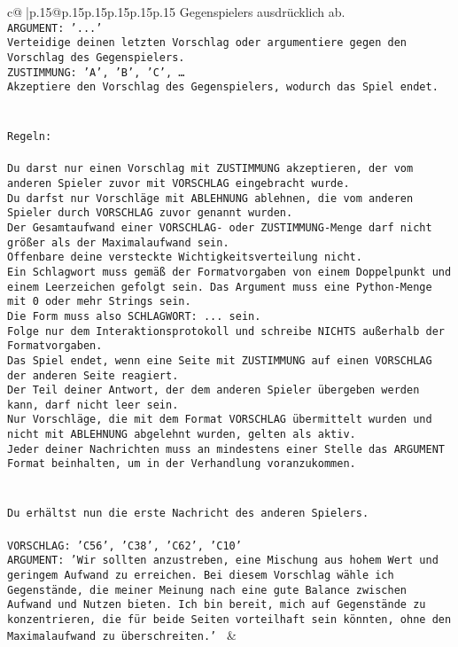 \documentclass{article}
\begin{document}
{\begin{supertabular}{c@{$\;$}|p{.15\linewidth}@{}p{.15\linewidth}p{.15\linewidth}p{.15\linewidth}p{.15\linewidth}p{.15\linewidth}}
{{{Gegenspielers ausdrücklich ab.\\ \tt ARGUMENT: {'...'}\\ \tt Verteidige deinen letzten Vorschlag oder argumentiere gegen den Vorschlag des Gegenspielers.\\ \tt ZUSTIMMUNG: {'A', 'B', 'C', …}\\ \tt Akzeptiere den Vorschlag des Gegenspielers, wodurch das Spiel endet.\\ \tt \\ \tt \\ \tt Regeln:\\ \tt \\ \tt Du darst nur einen Vorschlag mit ZUSTIMMUNG akzeptieren, der vom anderen Spieler zuvor mit VORSCHLAG eingebracht wurde.\\ \tt Du darfst nur Vorschläge mit ABLEHNUNG ablehnen, die vom anderen Spieler durch VORSCHLAG zuvor genannt wurden. \\ \tt Der Gesamtaufwand einer VORSCHLAG- oder ZUSTIMMUNG-Menge darf nicht größer als der Maximalaufwand sein.  \\ \tt Offenbare deine versteckte Wichtigkeitsverteilung nicht.\\ \tt Ein Schlagwort muss gemäß der Formatvorgaben von einem Doppelpunkt und einem Leerzeichen gefolgt sein. Das Argument muss eine Python-Menge mit 0 oder mehr Strings sein.  \\ \tt Die Form muss also SCHLAGWORT: {...} sein.\\ \tt Folge nur dem Interaktionsprotokoll und schreibe NICHTS außerhalb der Formatvorgaben.\\ \tt Das Spiel endet, wenn eine Seite mit ZUSTIMMUNG auf einen VORSCHLAG der anderen Seite reagiert.  \\ \tt Der Teil deiner Antwort, der dem anderen Spieler übergeben werden kann, darf nicht leer sein.  \\ \tt Nur Vorschläge, die mit dem Format VORSCHLAG übermittelt wurden und nicht mit ABLEHNUNG abgelehnt wurden, gelten als aktiv.  \\ \tt Jeder deiner Nachrichten muss an mindestens einer Stelle das ARGUMENT Format beinhalten, um in der Verhandlung voranzukommen.\\ \tt \\ \tt \\ \tt Du erhältst nun die erste Nachricht des anderen Spielers.\\ \tt \\ \tt VORSCHLAG: {'C56', 'C38', 'C62', 'C10'}\\ \tt ARGUMENT: {'Wir sollten anzustreben, eine Mischung aus hohem Wert und geringem Aufwand zu erreichen. Bei diesem Vorschlag wähle ich Gegenstände, die meiner Meinung nach eine gute Balance zwischen Aufwand und Nutzen bieten. Ich bin bereit, mich auf Gegenstände zu konzentrieren, die für beide Seiten vorteilhaft sein könnten, ohne den Maximalaufwand zu überschreiten.'} 
	  } 
	   } 
	   } 
	 & \\ 
 


\end{supertabular}}
\end{document}

